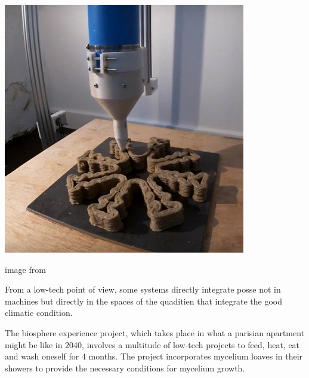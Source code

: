 \begin{marginfigure}
    \centering
    \includegraphics{images/printMycelium2.png}
    \caption{image from \cite{blaststudio}}
    \label{fig:blasttrash}
\end{marginfigure} 


From a low-tech point of view, some systems directly integrate posse not in machines but directly in the spaces of the quaditien that integrate the good climatic condition. 

The biosphere experience project, which takes place in what a parisian apartment might be like in 2040, involves a multitude of low-tech projects to feed, heat, eat and wash oneself for 4 months. The project incorporates mycelium loaves in their showers to provide the necessary conditions for mycelium growth. 



